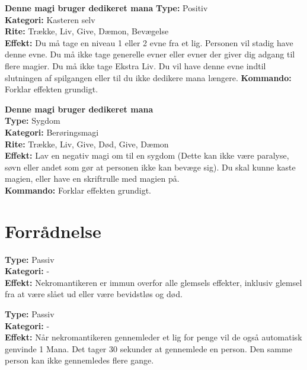\begin{nSjæl*}
\textbf{Denne magi bruger dedikeret mana}
\textbf{Type:} Positiv\\
\textbf{Kategori:} Kasteren selv\\
\textbf{Rite:} Trække, Liv, Give, Dæmon, Bevægelse\\
\textbf{Effekt:} Du må tage en niveau 1 eller 2 evne fra et lig. Personen vil stadig have denne evne. Du må ikke tage generelle evner eller evner der giver dig adgang til flere magier. Du må ikke tage Ekstra Liv. Du vil have denne evne indtil slutningen af spilgangen eller til du ikke dedikere mana længere.
\textbf{Kommando:} Forklar effekten grundigt.\\
\end{nSjæl*}

\begin{nSjæl*}
\textbf{Denne magi bruger dedikeret mana}\\
\textbf{Type:} Sygdom\\
\textbf{Kategori:} Berøringsmagi\\
\textbf{Rite:} Trække, Liv, Give, Død, Give, Dæmon\\
\textbf{Effekt:} Lav en negativ magi om til en sygdom (Dette kan ikke være paralyse, søvn eller andet som gør at personen ikke kan bevæge sig). Du skal kunne kaste magien, eller have en skriftrulle med magien på.\\
\textbf{Kommando:} Forklar effekten grundigt.
\end{nSjæl*}

\section{Forrådnelse}

\begin{død*}
\textbf{Type:} Passiv\\
\textbf{Kategori:} -\\
\textbf{Effekt:} Nekromantikeren er immun overfor alle glemsels effekter, inklusiv glemsel fra at være slået ud eller være bevidstløs og død.
\end{død*}

\begin{død*}
\textbf{Type:} Passiv \\
\textbf{Kategori:} -\\
\textbf{Effekt:} Når nekromantikeren gennemleder et lig for penge vil de også automatisk genvinde 1 Mana. Det tager 30 sekunder at gennemlede en person. Den samme person kan ikke gennemledes flere gange.\\
\end{død*}


